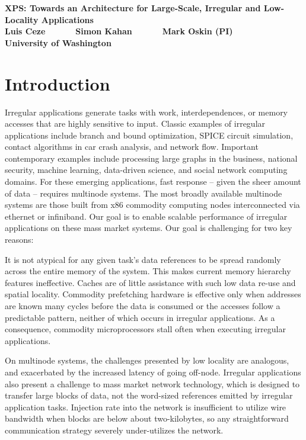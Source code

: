 


\begin{center}
  \textbf{\Large XPS: Towards an Architecture for Large-Scale, Irregular and Low-Locality Applications}\\ \vspace{5mm}
  \textbf{Luis Ceze ~~~~~ Simon Kahan ~~~~~ Mark Oskin (PI)}\\
  \textbf{University of Washington}
\end{center}

\section{Introduction}

Irregular applications generate tasks with work, interdependences, or memory accesses that are highly sensitive to input. Classic examples of irregular applications include branch and bound optimization, SPICE circuit simulation, contact algorithms in car crash analysis, and network flow. Important contemporary examples include processing large graphs in the business, national security, machine learning, data-driven science, and social network computing domains. For these emerging applications, fast response -- given the sheer amount of data -- requires multinode systems. The most broadly available multinode systems are those built from x86 commodity computing nodes interconnected via ethernet or infiniband. Our goal is to enable scalable performance of irregular applications on these mass market systems.  Our goal is challenging for two key reasons:

 It is not atypical for any given task's data references to be spread randomly across the entire memory of the system. This makes current memory hierarchy features ineffective. Caches are of little assistance with such low data re-use and spatial locality. Commodity prefetching hardware is effective only when addresses are known many cycles before the data is consumed or the accesses follow a predictable pattern, neither of which occurs in irregular applications. As a consequence, commodity microprocessors stall often when executing irregular applications.

 On multinode systems, the challenges presented by low locality are analogous, and exacerbated by the increased latency of going off-node. Irregular applications also present a challenge to mass market network technology, which is designed to transfer large blocks of data, not the word-sized references emitted by irregular application tasks. Injection rate into the network is insufficient to utilize wire bandwidth when blocks are below about two-kilobytes, so any straightforward communication strategy severely under-utilizes the network.

